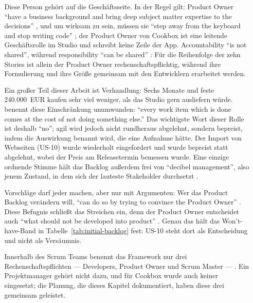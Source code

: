 Diese Person gehört auf die Geschäftsseite. In der Regel gilt: Product Owner
\enquote{have a business background and bring deep subject matter expertise to
the decisions} \parencite[p.~41]{pmi2017}, und um wirksam zu sein, müssen sie
\enquote{step away from the keyboard and stop writing code} \parencite[ch.~11, pp.~79--84]{kelly2019};
der Product Owner von Cookbox ist eine leitende Geschäftsrolle im Studio und
schreibt keine Zeile der App. Accountability \enquote{is not shared}, während
responsibility \enquote{can be shared} \parencite[The Standard for Project Management,
Section~3.2]{pmbok2021}: Für die Reihenfolge der zehn Stories ist allein der
Product Owner rechenschaftspflichtig, während ihre Formulierung und ihre Größe
gemeinsam mit den Entwicklern erarbeitet werden.

Ein großer Teil dieser Arbeit ist Verhandlung: Sechs Monate und feste
240.000~EUR kaufen sehr viel weniger, als das Studio gern ausliefern würde.
\textcite[ch.~2, pp.~11--20]{kelly2019}
benennt diese Einschränkung unumwunden: \enquote{every work item which is done comes at
the cost of not doing something else.} Das wichtigste Wort dieser Rolle ist
deshalb \enquote{no}; agil wird jedoch nicht rundheraus abgelehnt, sondern
bepreist, indem die Auswirkung benannt wird, die eine Aufnahme hätte. Der Import
von Webseiten (US-10) wurde wiederholt eingefordert und wurde bepreist statt
abgelehnt, wobei der Preis am Releasetermin bemessen wurde. Eine einzige
ordnende Stimme hält das Backlog außerdem frei von \enquote{decibel management},
also jenem Zustand, in dem sich der lauteste Stakeholder durchsetzt
\parencite[ch.~2, pp.~11--20]{kelly2019}.

Vorschläge darf jeder machen, aber nur mit Argumenten: Wer das Product Backlog
verändern will, \enquote{can do so by trying to convince the Product Owner}
\parencite[p.~6]{scrumguide2020}. Diese Befugnis schließt das Streichen ein, denn
der Product Owner entscheidet auch \enquote{what should not be developed into product}
\parencite[ch.~8, pp.~57--62]{kelly2019}. Genau das hält das Won't-have-Band in
Tabelle~\ref{tab:initial-backlog} fest: US-10 steht dort als Entscheidung und
nicht als Versäumnis.

Innerhalb des Scrum Teams benennt das Framework nur drei Rechenschaftspflichten
--- Developers, Product Owner und Scrum Master --- \parencite[p.~5]{scrumguide2020}.
Ein Projektmanager gehört nicht dazu, und für Cookbox wurde auch keiner
eingesetzt; die Planung, die dieses Kapitel dokumentiert, haben diese drei
gemeinsam geleistet.

